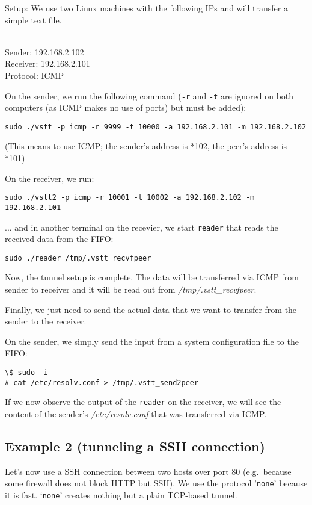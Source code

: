 \documentclass[10pt,a4paper]{article}
\begin{document}
Setup: We use two Linux machines with the following IPs and will transfer a simple text file.

~\\
Sender:   192.168.2.102\\
Receiver: 192.168.2.101\\
Protocol: ICMP

On the sender, we run the following command (\texttt{-r} and \texttt{-t} are ignored on both computers (as ICMP makes no use of ports) but must be added):

\texttt{sudo ./vstt -p icmp -r 9999 -t 10000 -a 192.168.2.101 -m 192.168.2.102}

(This means to use ICMP; the sender's address is *102, the peer's address is *101)

On the receiver, we run:

\texttt{sudo ./vstt2 -p icmp -r 10001 -t 10002 -a 192.168.2.102 -m 192.168.2.101}

... and in another terminal on the recevier, we start \texttt{reader} that reads the received data from the FIFO:

\texttt{sudo ./reader /tmp/.vstt\_recvfpeer}

Now, the tunnel setup is complete. The data will be transferred via ICMP from sender to receiver and it will be read out from \textit{/tmp/.vstt\_recvfpeer}.

Finally, we just need to send the actual data that we want to transfer from the sender to the receiver.

On the sender, we simply send the input from a system configuration file to the FIFO:

\begin{verbatim}
\$ sudo -i
# cat /etc/resolv.conf > /tmp/.vstt_send2peer
\end{verbatim}

If we now observe the output of the \texttt{reader} on the receiver, we will see the content of the sender's \textit{/etc/resolv.conf} that was transferred via ICMP.


\subsection{Example 2 (tunneling a SSH connection)}

Let's now use a SSH connection between two hosts over port 80 (e.g.\ because some firewall does not block HTTP but SSH). We use the protocol '\texttt{none}' because it is fast. `\texttt{none}' creates nothing but a plain TCP-based tunnel.
\end{document}
